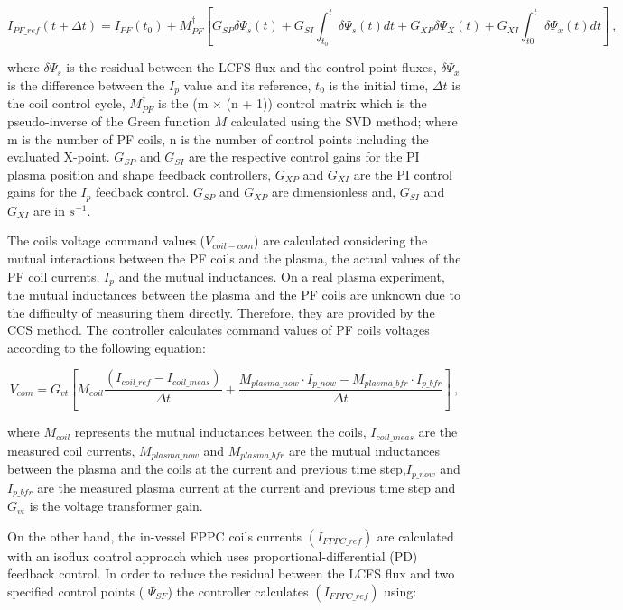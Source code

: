 \begin{equation}
I_{PF\_ref}(t+\Delta t) = I_{PF}(t_0)+M^\dagger_{PF}\left[G_{SP}\delta\Psi_s(t)+G_{SI}\int_{t_0}^{t}\delta\Psi_s(t)dt+G_{XP}\delta\Psi_X(t)+G_{XI}\int_{t0}^{t}\delta\Psi_x(t)dt\right]~,
\end{equation}

where $\delta\Psi_s$ is the residual between the  LCFS flux and the control point fluxes,   $\delta\Psi_x$ is the difference between the $I_p$ value and its reference, $t_0$ is the initial time, $\Delta t$ is the coil control cycle, $M^\dagger_{PF}$ is the (m $\times$ (n + 1)) control matrix which is the pseudo-inverse of the Green function $M$ calculated using the SVD method; where m is the number of PF coils, n is the number of control points including the evaluated X-point. $G_{SP}$ and $G_{SI}$ are the respective control gains for the PI plasma position and shape feedback controllers, $ G_{XP}$ and $G_{XI}$ are the PI control gains for the $I_p$ feedback control. $G_{SP}$ and $G_{XP}$ are dimensionless and, $G_{SI}$ and  $G_{XI}$ are in $s^{-1}$. \smallskip



The coils voltage command values ($V_{coil-com}$) are calculated considering the mutual interactions between the PF coils and the plasma, the actual values of the PF coil currents, $I_p$ and the mutual inductances. On a real plasma experiment, the  mutual inductances between the plasma and the PF coils are unknown due to the difficulty of measuring them directly. Therefore, they are provided by the CCS method. The controller calculates command values of PF coils voltages according to the following equation:



\begin{equation}
V_{com}=G_{vt}\left[M_{coil}\frac{(I_{coil\_ref}-I_{coil\_meas})}{\Delta t}+ \frac{M_{plasma\_now} \cdot I_{p\_now} - M_{plasma\_ bfr} \cdot I_{p\_bfr}}{\Delta t}\right]~,
\end{equation}

where $M_{coil} $ represents the mutual inductances between the coils, $I_{coil\_meas}  $ are the measured coil currents,  $M_{plasma\_now}$ and $ M_{plasma\_ bfr}$ are the mutual inductances between the plasma and the coils at the current and previous time step,$  I_{p\_now} $  and  $ I_{p\_bfr} $ are the measured plasma current at the current and previous time step  and $ G_{vt} $ is the voltage transformer gain.
\smallskip

On the other hand, the in-vessel FPPC coils currents $ (I_{FPPC\_ref})  $ are calculated with an isoflux control approach which uses proportional-differential (PD) feedback control. In order to reduce  the residual between the LCFS flux and two specified control points ( $ \Psi_{SF} $)  the controller calculates  $ (I_{FPPC\_ref})  $ using:

